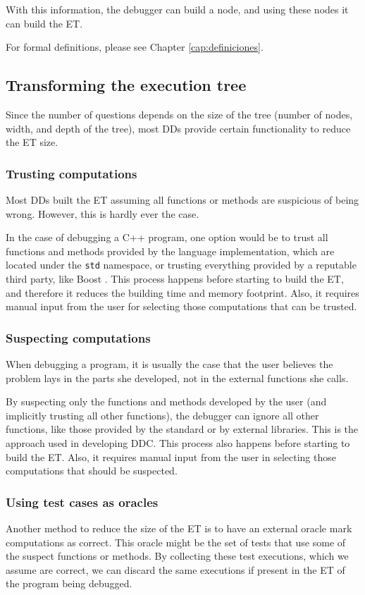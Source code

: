 With this information, the debugger can build a node, and using these nodes it can build the ET.

For formal definitions, please see Chapter \ref{cap:definiciones}.

\subsection{Transforming the execution tree}

Since the number of questions depends on the size of the tree (number of nodes, width, and depth of the tree), most DDs provide certain functionality to reduce the ET size.

\subsubsection{Trusting computations}

Most DDs built the ET assuming all functions or methods are suspicious  of being wrong.
However, this is hardly ever the case.

In the case of debugging a C++ program, one option would be to trust all functions and methods provided by the language implementation, which are located under the \verb|std| namespace, or trusting everything provided by a reputable third party, like Boost \cite{TheBoostLibraries}.
This process happens before starting to build the ET, and therefore it reduces the building time and memory footprint. Also, it requires manual input from the user for selecting those computations that can be trusted.

\subsubsection{Suspecting computations}

When debugging a program, it is usually the case that the user believes the problem lays in the parts she developed, not in the external functions she calls.

By suspecting only the functions and methods developed by the user (and implicitly trusting all other functions), the debugger can ignore all other functions, like those provided by the standard or by external libraries.
This is the approach used in developing DDC.
This process also happens before starting to build the ET. Also, it requires manual input from the user in selecting those computations that should be suspected.
\subsubsection{Using test cases as oracles}
Another method to reduce the size of the ET is to have an external oracle mark computations as correct.
This oracle might be the set of tests that use some of the suspect functions or methods. By collecting these test executions, which we assume are correct, we can discard the same executions if present in the ET of the program being debugged.

